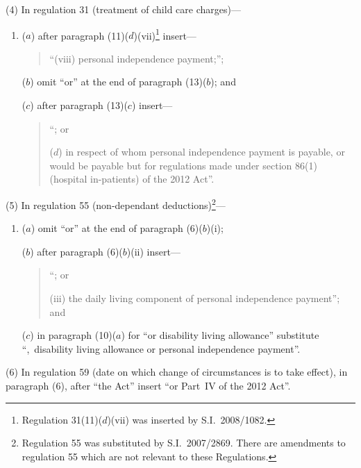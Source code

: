 \documentclass[12pt,a4paper]{article}
\begin{document}
(4) In regulation 31 (treatment of child care charges)—
\begin{enumerate}\item[]
($a$) after paragraph (11)($d$)(vii)\footnote{Regulation 31(11)($d$)(vii)  was inserted by S.I.~2008/1082.} insert—
\begin{quotation}
“(viii) personal independence payment;”;
\end{quotation}

($b$) omit “or” at the end of paragraph (13)($b$); and

($c$) after paragraph (13)($c$)  insert—
\begin{quotation}
“; or

($d$) in respect of whom personal independence payment is payable, or would be payable but for regulations made under section 86(1) (hospital in-patients) of the 2012 Act”.
\end{quotation}
\end{enumerate}

(5) In regulation 55 (non-dependant deductions)\footnote{Regulation 55 was substituted by S.I.~2007/2869. There are amendments to regulation 55 which are not relevant to these Regulations.}—
\begin{enumerate}\item[]
($a$) omit “or” at the end of paragraph (6)($b$)(i);

($b$) after paragraph (6)($b$)(ii)  insert—
\begin{quotation}
“; or

(iii) the daily living component of personal independence payment”; and
\end{quotation}

($c$) in paragraph (10)($a$)  for “or disability living allowance” substitute “,~disability living allowance or personal independence payment”.
\end{enumerate}

(6) In regulation 59 (date on which change of circumstances is to take effect), in paragraph (6), after “the Act” insert “or Part~IV of the 2012 Act”.
\end{document}
